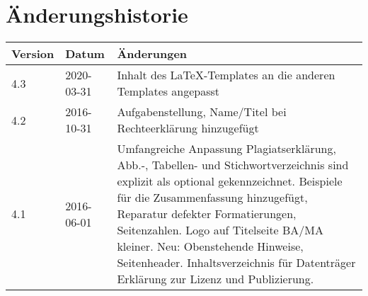 \section*{Änderungshistorie}


\begin{tabularx}{\textwidth}{@{}llX@{}}
\toprule
    \textbf{Version} & \textbf{Datum} & \textbf{Änderungen} \\
\midrule
4.3 & 2020-03-31 & Inhalt des \LaTeX-Templates an die anderen Templates angepasst \\
\midrule
4.2 & 2016-10-31 & Aufgabenstellung, Name/Titel bei Rechteerklärung hinzugefügt \\
\midrule
4.1 & 2016-06-01 & Umfangreiche Anpassung Plagiatserklärung, Abb.-, Tabellen- und Stichwortverzeichnis sind explizit als optional gekennzeichnet. Beispiele für die Zusammenfassung hinzugefügt, Reparatur defekter Formatierungen, Seitenzahlen. Logo auf Titelseite BA/MA kleiner.
Neu: Obenstehende Hinweise, Seitenheader. Inhaltsverzeichnis für Datenträger Erklärung zur Lizenz und Publizierung. \\
\bottomrule
\end{tabularx}
